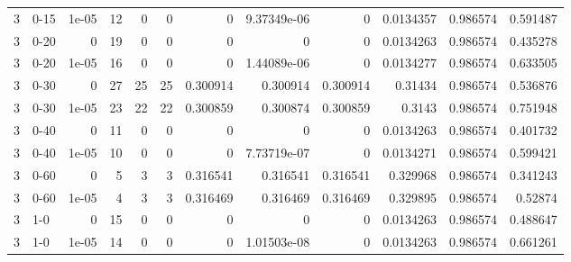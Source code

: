 \begin{tabular}{rlrrrrrrrrrr}
     3 & 0-15   &      1e-05 &          12 &                 0 &                 0 &     0           &     9.37349e-06 &      0           &        0.0134357 &               0.986574 &           0.591487 \\
     3 & 0-20   &      0     &          19 &                 0 &                 0 &     0           &     0           &      0           &        0.0134263 &               0.986574 &           0.435278 \\
     3 & 0-20   &      1e-05 &          16 &                 0 &                 0 &     0           &     1.44089e-06 &      0           &        0.0134277 &               0.986574 &           0.633505 \\
     3 & 0-30   &      0     &          27 &                25 &                25 &     0.300914    &     0.300914    &      0.300914    &        0.31434   &               0.986574 &           0.536876 \\
     3 & 0-30   &      1e-05 &          23 &                22 &                22 &     0.300859    &     0.300874    &      0.300859    &        0.3143    &               0.986574 &           0.751948 \\
     3 & 0-40   &      0     &          11 &                 0 &                 0 &     0           &     0           &      0           &        0.0134263 &               0.986574 &           0.401732 \\
     3 & 0-40   &      1e-05 &          10 &                 0 &                 0 &     0           &     7.73719e-07 &      0           &        0.0134271 &               0.986574 &           0.599421 \\
     3 & 0-60   &      0     &           5 &                 3 &                 3 &     0.316541    &     0.316541    &      0.316541    &        0.329968  &               0.986574 &           0.341243 \\
     3 & 0-60   &      1e-05 &           4 &                 3 &                 3 &     0.316469    &     0.316469    &      0.316469    &        0.329895  &               0.986574 &           0.52874  \\
     3 & 1-0    &      0     &          15 &                 0 &                 0 &     0           &     0           &      0           &        0.0134263 &               0.986574 &           0.488647 \\
     3 & 1-0    &      1e-05 &          14 &                 0 &                 0 &     0           &     1.01503e-08 &      0           &        0.0134263 &               0.986574 &           0.661261 \\

\end{tabular}
